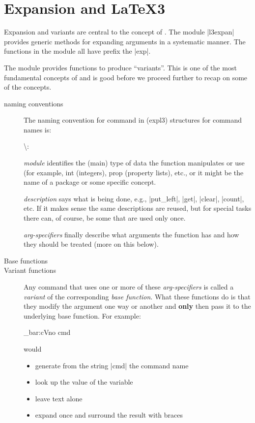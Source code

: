\chapter{Expansion and LaTeX3}

Expansion and variants are central to the concept of . The module |l3expan| provides generic methods for expanding \tex arguments in a systematic manner. The functions in the module all have prefix the |exp|.

The module provides functions to produce \enquote{variants}. This is one of the most fundamental concepts of  and is good before we proceed further to recap on some of the  concepts.

\begin{description}
\item [naming conventions] The naming convention for command in  (expl3)  structures for command names is:

\textbackslash {}\textunderscore {}: 

\textit{module} identifies the (main) type of data the function manipulates or use (for example, int (integers), prop (property lists), etc., or it might be the name of a package or some specific concept. 

\textit{description} says what is being done, e.g., |put_left|, |get|, |clear|, |count|, etc. If it makes sense the same descriptions are reused, but for special tasks there can, of course, be some that are used only once.

\textit{arg-specifiers} finally describe what arguments the function has and how they should be treated (more on this below).


\item[Base functions] \lorem 

\item[Variant functions]  Any command that uses one or more of these \emph{arg-specifiers} is called a \emph{variant} of the corresponding \emph{base function}. What these functions do is that they modify the argument one way or another and \textbf{only} then pass it to the underlying base function. For example:

\begin{teXXX}
\foo_bar:cVno {cmd}  \CMD
\end{teXXX}

would

\begin{itemize}
\item generate from the string |cmd| the command name 
\item look up the value of the variable 
\item leave text alone
\item expand  once and surround the result with braces
\end{itemize}


\end{description}
